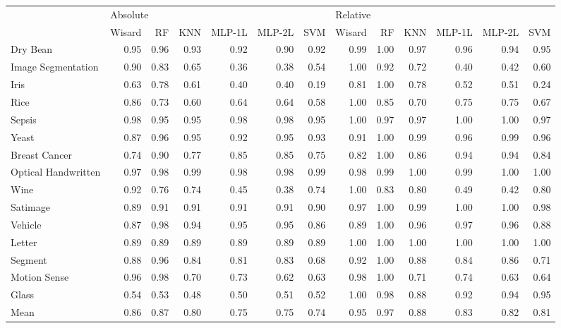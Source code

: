 \begin{tabular}{lrrrrrrrrrrrr}
\toprule
{} & \multicolumn{6}{l}{Absolute} & \multicolumn{6}{l}{Relative} \\
{} &   Wisard &   RF &  KNN & MLP-1L & MLP-2L &  SVM &   Wisard &   RF &  KNN & MLP-1L & MLP-2L &  SVM \\
\midrule
Dry Bean            &     0.95 & 0.96 & 0.93 &   0.92 &   0.90 & 0.92 &     0.99 & 1.00 & 0.97 &   0.96 &   0.94 & 0.95 \\
Image Segmentation  &     0.90 & 0.83 & 0.65 &   0.36 &   0.38 & 0.54 &     1.00 & 0.92 & 0.72 &   0.40 &   0.42 & 0.60 \\
Iris                &     0.63 & 0.78 & 0.61 &   0.40 &   0.40 & 0.19 &     0.81 & 1.00 & 0.78 &   0.52 &   0.51 & 0.24 \\
Rice                &     0.86 & 0.73 & 0.60 &   0.64 &   0.64 & 0.58 &     1.00 & 0.85 & 0.70 &   0.75 &   0.75 & 0.67 \\
Sepsis              &     0.98 & 0.95 & 0.95 &   0.98 &   0.98 & 0.95 &     1.00 & 0.97 & 0.97 &   1.00 &   1.00 & 0.97 \\
Yeast               &     0.87 & 0.96 & 0.95 &   0.92 &   0.95 & 0.93 &     0.91 & 1.00 & 0.99 &   0.96 &   0.99 & 0.96 \\
Breast Cancer       &     0.74 & 0.90 & 0.77 &   0.85 &   0.85 & 0.75 &     0.82 & 1.00 & 0.86 &   0.94 &   0.94 & 0.84 \\
Optical Handwritten &     0.97 & 0.98 & 0.99 &   0.98 &   0.98 & 0.99 &     0.98 & 0.99 & 1.00 &   0.99 &   1.00 & 1.00 \\
Wine                &     0.92 & 0.76 & 0.74 &   0.45 &   0.38 & 0.74 &     1.00 & 0.83 & 0.80 &   0.49 &   0.42 & 0.80 \\
Satimage            &     0.89 & 0.91 & 0.91 &   0.91 &   0.91 & 0.90 &     0.97 & 1.00 & 0.99 &   1.00 &   1.00 & 0.98 \\
Vehicle             &     0.87 & 0.98 & 0.94 &   0.95 &   0.95 & 0.86 &     0.89 & 1.00 & 0.96 &   0.97 &   0.96 & 0.88 \\
Letter              &     0.89 & 0.89 & 0.89 &   0.89 &   0.89 & 0.89 &     1.00 & 1.00 & 1.00 &   1.00 &   1.00 & 1.00 \\
Segment             &     0.88 & 0.96 & 0.84 &   0.81 &   0.83 & 0.68 &     0.92 & 1.00 & 0.88 &   0.84 &   0.86 & 0.71 \\
Motion Sense        &     0.96 & 0.98 & 0.70 &   0.73 &   0.62 & 0.63 &     0.98 & 1.00 & 0.71 &   0.74 &   0.63 & 0.64 \\
Glass               &     0.54 & 0.53 & 0.48 &   0.50 &   0.51 & 0.52 &     1.00 & 0.98 & 0.88 &   0.92 &   0.94 & 0.95 \\
Mean                &     0.86 & 0.87 & 0.80 &   0.75 &   0.75 & 0.74 &     0.95 & 0.97 & 0.88 &   0.83 &   0.82 & 0.81 \\
\bottomrule
\end{tabular}
